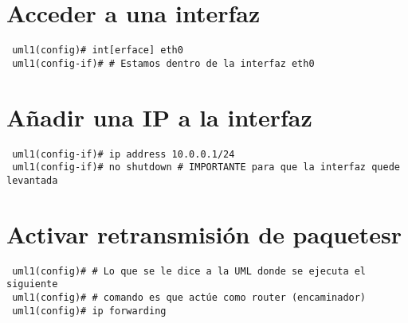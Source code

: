 \documentclass{article}
\begin{document}
\section{Acceder a una interfaz}
\begin{verbatim}
 uml1(config)# int[erface] eth0
 uml1(config-if)# # Estamos dentro de la interfaz eth0
\end{verbatim}

\section{Añadir una IP a la interfaz}
\begin{verbatim}
 uml1(config-if)# ip address 10.0.0.1/24
 uml1(config-if)# no shutdown # IMPORTANTE para que la interfaz quede levantada
\end{verbatim}

\section{Activar retransmisión de paquetesr}
\begin{verbatim}
 uml1(config)# # Lo que se le dice a la UML donde se ejecuta el siguiente
 uml1(config)# # comando es que actúe como router (encaminador)
 uml1(config)# ip forwarding
\end{verbatim}

\section{}
\begin{verbatim}
\end{verbatim}

\section{}
\begin{verbatim}
\end{verbatim}

\section{}
\begin{verbatim}
\end{verbatim}

\section{}
\begin{verbatim}
\end{verbatim}
\end{document}
